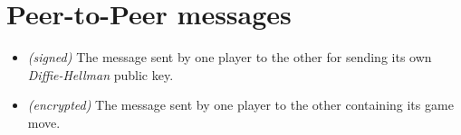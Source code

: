 \section{Peer-to-Peer messages}\label{sec:p2pmsgs}

\begin{itemize}
	\item[]  \emph{(signed)} The message sent by one player
		to the other for sending its own \emph{Diffie-Hellman} public
		key.
	\item[]  \emph{(encrypted)} The message sent by one
		player to the other containing its game move.
\end{itemize}
